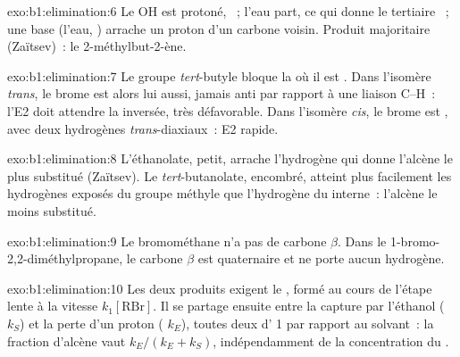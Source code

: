 \begin{solution}{exo:b1:elimination:6}
Le OH est protoné, ~; l'eau part, ce qui donne le
 tertiaire ~; une base (l'eau, )
arrache un proton d'un carbone voisin. Produit majoritaire (Zaïtsev)~:
le 2-méthylbut-2-ène.
\end{solution}

\begin{solution}{exo:b1:elimination:7}
Le groupe \textit{tert}-butyle bloque la  où il est .
Dans l'isomère \textit{trans}, le brome est alors  lui aussi,
jamais anti par rapport à une liaison C--H~: l'E2 doit attendre la
 inversée, très défavorable. Dans l'isomère \textit{cis}, le brome
est , avec deux hydrogènes \textit{trans}-diaxiaux~: E2 rapide.
\end{solution}

\begin{solution}{exo:b1:elimination:8}
L'éthanolate, petit, arrache l'hydrogène qui donne l'alcène le plus
substitué (Zaïtsev). Le \textit{tert}-butanolate, encombré, atteint plus
facilement les hydrogènes exposés du groupe méthyle que l'hydrogène du
 interne~: l'alcène le moins substitué.
\end{solution}

\begin{solution}{exo:b1:elimination:9}
Le bromométhane n'a pas de carbone $\beta$. Dans le
1-bromo-2,2-diméthylpropane, le carbone $\beta$ est quaternaire et ne
porte aucun hydrogène.
\end{solution}

\begin{solution}{exo:b1:elimination:10}
Les deux produits exigent le , formé au cours de l'étape
lente à la vitesse
$k_1[\mathrm{RBr}]$. Il se partage ensuite entre la capture par
l'éthanol ( $k_S$) et la perte d'un proton ( $k_E$), toutes deux d' 1 par rapport au
solvant~: la fraction d'alcène vaut $k_E/(k_E + k_S)$, indépendamment de
la concentration du .
\end{solution}

